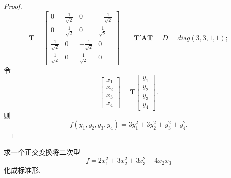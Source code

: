 \documentclass[lang=cn,11pt,normal]{elegantbook}
\begin{document}
\begin{proof}
		$$
		\boldsymbol{T}=
		\begin{bmatrix}
		0&\frac{1}{\sqrt{2}}&0&-\frac{1}{\sqrt{2}}\\
		0&\frac{1}{\sqrt{2}}&0&\frac{1}{\sqrt{2}}\\
		\frac{1}{\sqrt{2}}&0&-\frac{1}{\sqrt{2}}&0\\
		\frac{1}{\sqrt{2}}&0&\frac{1}{\sqrt{2}}&0
		\end{bmatrix}
		\qquad\boldsymbol{T}'\boldsymbol{AT}=D=diag(3,3,1,1);
		$$
		令
		$$
		\begin{bmatrix}
		x_1\\x_2\\x_3\\x_4
		\end{bmatrix}
		=
		\boldsymbol{T}
		\begin{bmatrix}
		y_1\\y_2\\y_3\\y_4
		\end{bmatrix}.
		$$
		则\\
		$$f(y_1,y_2,y_3,y_4)=3y_1^2+3y_2^2+y_3^2+y_4^2.$$
	\end{proof}
	\begin{exercise}
		求一个正交变换将二次型
		$$
		f=2x_1^2+3x_2^2+3x_3^2+4x_2x_3
		$$
		化成标准形.
	\end{exercise}
\end{document}
